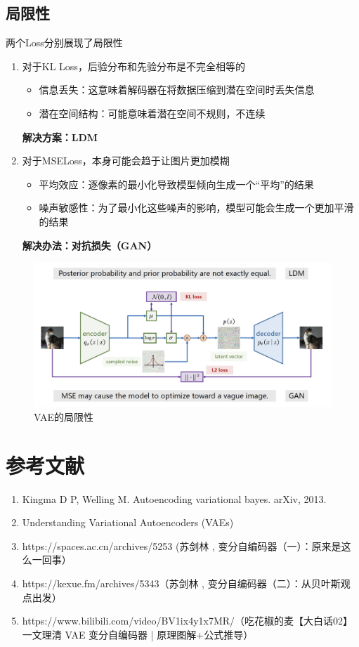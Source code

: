 \subsection{局限性}
两个Loss分别展现了局限性
\begin{enumerate}
    \item 对于KL Loss，后验分布和先验分布是不完全相等的
        \begin{itemize}
            \item 信息丢失：这意味着解码器在将数据压缩到潜在空间时丢失信息
            \item 潜在空间结构：可能意味着潜在空间不规则，不连续
        \end{itemize}
        \textbf{解决方案：LDM}
    \item 对于MSELoss，本身可能会趋于让图片更加模糊
        \begin{itemize}
            \item 平均效应：逐像素的最小化导致模型倾向生成一个“平均”的结果
            \item 噪声敏感性：为了最小化这些噪声的影响，模型可能会生成一个更加平滑的结果
        \end{itemize}
        \textbf{解决办法：对抗损失（GAN）}
\end{enumerate}

\begin{figure}[htbp]
    \centering
    \includegraphics[width=\textwidth]{figures/chapter2/shortcoming.png}
    \caption{VAE的局限性}
    \label{fig:vae_limit}
\end{figure}

\FloatBarrier


\section{参考文献}
\begin{enumerate}
    \item Kingma D P, Welling M. Autoencoding variational bayes. arXiv, 2013.
    \item Understanding Variational Autoencoders (VAEs)
    \item https://spaces.ac.cn/archives/5253 (苏剑林 , 变分自编码器（一）：原来是这么一回事）
    \item https://kexue.fm/archives/5343（苏剑林 , 变分自编码器（二）：从贝叶斯观点出发）
    \item https://www.bilibili.com/video/BV1ix4y1x7MR/（吃花椒的麦【大白话02】一文理清 VAE 变分自编码器 | 原理图解+公式推导）
\end{enumerate}




